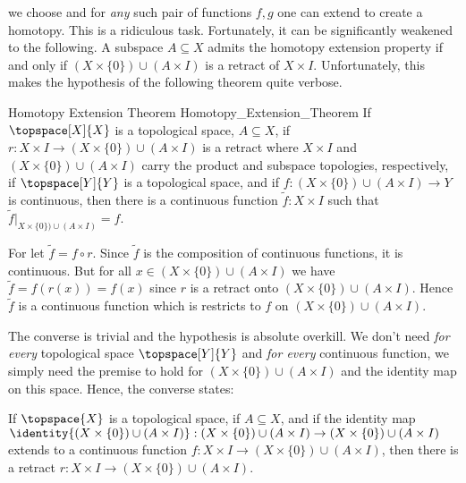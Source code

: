         we choose and for \textit{any} such pair of functions $f,g$ one
        can extend to create a homotopy. This is a ridiculous task.
        Fortunately, it can be significantly weakened to the following.
        A subspace $A\subseteq{X}$ admits the homotopy extension
        property if and only if $(X\times\{0\})\cup(A\times{I})$ is a
        retract of $X\times{I}$. Unfortunately, this makes the
        hypothesis of the following theorem quite verbose.
        \begin{ftheorem}{Homotopy Extension Theorem}
                        {Homotopy_Extension_Theorem}
            If $\topspace[X]{X}$ is a topological space,
            $A\subseteq{X}$, if
            $r:X\times{I}\rightarrow(X\times\{0\})\cup(A\times{I})$ is a
            retract where $X\times{I}$ and
            $(X\times\{0\})\cup(A\times{I})$ carry the product and
            subspace topologies, respectively, if $\topspace[Y]{Y}$ is a
            topological space, and if
            $f:(X\times\{0\})\cup(A\times{I})\rightarrow{Y}$ is
            continuous, then there is a continuous function
            $\tilde{f}:X\times{I}$ such that
            $\tilde{f}|_{X\times\{0\})\cup(A\times{I})}=f$.
        \end{ftheorem}
        \begin{bproof}
            For let $\tilde{f}=f\circ{r}$. Since $\tilde{f}$ is the
            composition of continuous functions, it is continuous. But
            for all $x\in(X\times\{0\})\cup(A\times{I})$ we have
            $\tilde{f}=f(r(x))=f(x)$ since $r$ is a retract onto
            $(X\times\{0\})\cup(A\times{I})$. Hence $\tilde{f}$ is a
            continuous function which is restricts to $f$ on
            $(X\times\{0\})\cup(A\times{I})$.
        \end{bproof}
        The converse is trivial and the hypothesis is absolute overkill.
        We don't need \textit{for every} topological space
        $\topspace[Y]{Y}$ and \textit{for every} continuous function, we
        simply need the premise to hold for
        $(X\times\{0\})\cup(A\times{I})$ and the identity map on this
        space. Hence, the converse states:
        \begin{theorem}
            If $\topspace{X}$ is a topological space, if
            $A\subseteq{X}$, and if the identity map
            $\identity{(X\times\{0\})\cup(A\times{I})}:%
            (X\times\{0\})\cup(A\times{I})\rightarrow%
            (X\times\{0\})\cup(A\times{I})$ extends to a continuous
            function
            $f:X\times{I}\rightarrow(X\times\{0\})\cup(A\times{I})$,
            then there is a retract
            $r:X\times{I}\rightarrow(X\times\{0\})\cup(A\times{I})$.
        \end{theorem}
